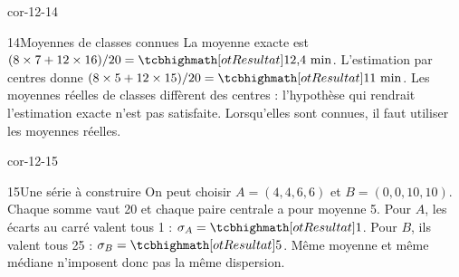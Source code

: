 \begin{blocLivre}{cor-12-14}
\begin{corrige}{14}{Moyennes de classes connues}
La moyenne exacte est $(8\times7+12\times16)/20=\res{12{,}4\text{ min}}$. L’estimation par centres donne $(8\times5+12\times15)/20=\res{11\text{ min}}$. Les moyennes réelles de classes diffèrent des centres : l’hypothèse qui rendrait l’estimation exacte n’est pas satisfaite. Lorsqu’elles sont connues, il faut utiliser les moyennes réelles.
\end{corrige}
\end{blocLivre}
\begin{blocLivre}{cor-12-15}
\begin{corrige}{15}{Une série à construire}
On peut choisir $A=(4,4,6,6)$ et $B=(0,0,10,10)$. Chaque somme vaut 20 et chaque paire centrale a pour moyenne 5. Pour $A$, les écarts au carré valent tous 1 : $\sigma_A=\res1$. Pour $B$, ils valent tous 25 : $\sigma_B=\res5$. Même moyenne et même médiane n’imposent donc pas la même dispersion.
\end{corrige}
\end{blocLivre}
